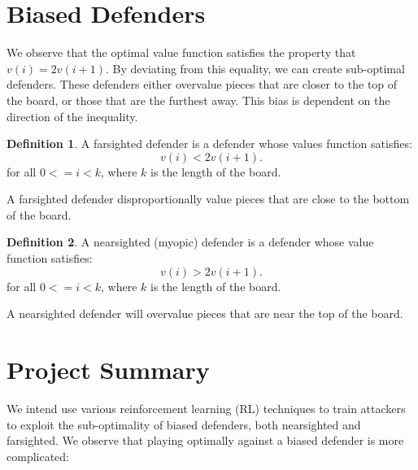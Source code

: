 \documentclass{article}
\theoremstyle{plain}
\theoremstyle{definition}
\newtheorem{defn}{Definition}[section]
\theoremstyle{remark}
\begin{document}

\section{Biased Defenders} %

We observe that the optimal value function satisfies the property that $v(i) = 2v(i+1)$. By deviating from this equality, we can create sub-optimal defenders. These defenders either overvalue pieces that are closer to the top of the board, or those that are the furthest away. This bias is dependent on the direction of the inequality.

\begin{defn}
  A farsighted defender is a defender whose values function satisfies:
  \begin{equation}
    v(i) < 2v(i+1).
  \end{equation}
  for all $0 <= i < k$, where $k$ is the length of the board.
\end{defn}

A farsighted defender disproportionally value pieces that are close to the bottom of the board. \\

\begin{defn}
  A nearsighted (myopic) defender is a defender whose value function satisfies:
  \begin{equation}
    v(i) > 2v(i+1).
  \end{equation}
  for all $0 <= i < k$, where $k$ is the length of the board.
\end{defn}

A nearsighted defender will overvalue pieces that are near the top of the board.


\section{Project Summary}

We intend use various reinforcement learning (RL) techniques to train attackers to exploit the sub-optimality of biased defenders, both nearsighted and farsighted. We observe that playing optimally against a biased defender is more complicated:
\end{document}
